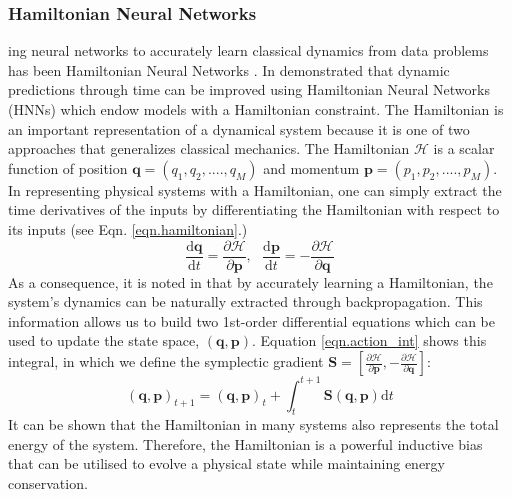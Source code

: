 \documentclass{article}
\begin{document}
\subsubsection*{Hamiltonian Neural Networks}

ing neural networks to accurately learn classical dynamics from data  problems has been Hamiltonian Neural Networks \cite{greydanus_hamiltonian_2019}. In  demonstrated that dynamic predictions through time can be improved using Hamiltonian Neural Networks (HNNs) which endow models with a Hamiltonian constraint. The Hamiltonian is an important representation of a dynamical system because it is one of two approaches that generalizes classical mechanics. The Hamiltonian $\mathcal{H}$ is a scalar function of position $\mathbf{q} = (q_1,q_2,....,q_M)$ and momentum $\mathbf{p} = (p_1,p_2,....,p_M)$. In representing physical systems with a Hamiltonian, one can simply extract the time derivatives of the inputs by differentiating the Hamiltonian with respect to its inputs (see Eqn. \ref{eqn.hamiltonian}.)
\begin{equation}
\frac{\mathrm{d}\mathbf{q}}{\mathrm{d}t} = \frac{\partial \mathcal{H}}{\partial \mathbf{p}}, ~~~
\frac{\mathrm{d}\mathbf{p}}{\mathrm{d}t} = -\frac{\partial \mathcal{H}}{\partial \mathbf{q}}
\label{eqn.hamiltonian}
\end{equation}
As a consequence, it is noted in \cite{greydanus_hamiltonian_2019} that by accurately learning a Hamiltonian, the system's dynamics can be naturally extracted through backpropagation. This information allows us to build two 1st-order differential equations which can be used to update the state space, $(\mathbf{q},\mathbf{p})$. Equation \ref{eqn.action_int} shows this integral, in which we define the symplectic gradient $\mathbf{S}  = \left [ \frac{\partial \mathcal{H}}{\partial \mathbf{p}},-\frac{\partial \mathcal{H}}{\partial \mathbf{q}} \right ] $:
\begin{equation}
(\mathbf{q},\mathbf{p})_{t+1} = (\mathbf{q},\mathbf{p})_t + \int_t^{t+1} \mathbf{S}(\mathbf{q},\mathbf{p}) \mathrm{d}t
\label{eqn.action_int}
\end{equation}
It can be shown that the Hamiltonian in many systems also represents the total energy of the system. Therefore, the Hamiltonian is a powerful inductive bias that can be utilised to evolve a physical state while maintaining energy conservation.
\end{document}
